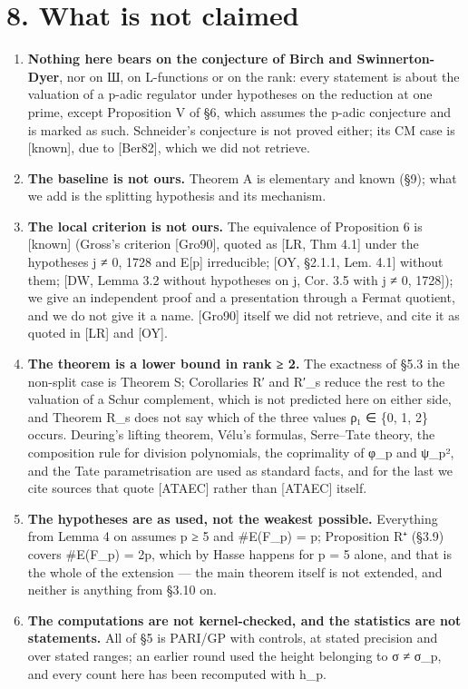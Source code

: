 \documentclass[11pt,a4paper]{article}
\theoremstyle{named}
\begin{document}
\section*{8. What is not claimed}

\begin{enumerate}[leftmargin=1.4em,itemsep=.2em,topsep=.3em]
\item \textbf{Nothing here bears on the conjecture of Birch and Swinnerton-Dyer}, nor on Ш, on L-functions or on the rank: every statement is about the valuation of a p-adic regulator under hypotheses on the reduction at one prime, except Proposition V of §6, which assumes the p-adic conjecture and is marked as such. Schneider's conjecture is not proved either; its CM case is [known], due to [Ber82], which we did not retrieve.
\item \textbf{The baseline is not ours.} Theorem A is elementary and known (§9); what we add is the splitting hypothesis and its mechanism.
\item \textbf{The local criterion is not ours.} The equivalence of Proposition 6 is [known] (Gross's criterion [Gro90], quoted as [LR, Thm 4.1] under the hypotheses j ≠ 0, 1728 and E[p] irreducible; [OY, §2.1.1, Lem. 4.1] without them; [DW, Lemma 3.2 without hypotheses on j, Cor. 3.5 with j ≠ 0, 1728]); we give an independent proof and a presentation through a Fermat quotient, and we do not give it a name. [Gro90] itself we did not retrieve, and cite it as quoted in [LR] and [OY].
\item \textbf{The theorem is a lower bound in rank ≥ 2.} The exactness of §5.3 in the non-split case is Theorem S; Corollaries R′ and R′\_s reduce the rest to the valuation of a Schur complement, which is not predicted here on either side, and Theorem R\_s does not say which of the three values ρ₁ ∈ \{0, 1, 2\} occurs. Deuring's lifting theorem, Vélu's formulas, Serre–Tate theory, the composition rule for division polynomials, the coprimality of φ\_p and ψ\_p², and the Tate parametrisation are used as standard facts, and for the last we cite sources that quote [ATAEC] rather than [ATAEC] itself.
\item \textbf{The hypotheses are as used, not the weakest possible.} Everything from Lemma 4 on assumes p ≥ 5 and \#E(F\_p) = p; Proposition R⁺ (§3.9) covers \#E(F\_p) = 2p, which by Hasse happens for p = 5 alone, and that is the whole of the extension — the main theorem itself is not extended, and neither is anything from §3.10 on.
\item \textbf{The computations are not kernel-checked, and the statistics are not statements.} All of §5 is PARI/GP with controls, at stated precision and over stated ranges; an earlier round used the height belonging to σ ≠ σ\_p, and every count here has been recomputed with h\_p.

\end{enumerate}
\end{document}
